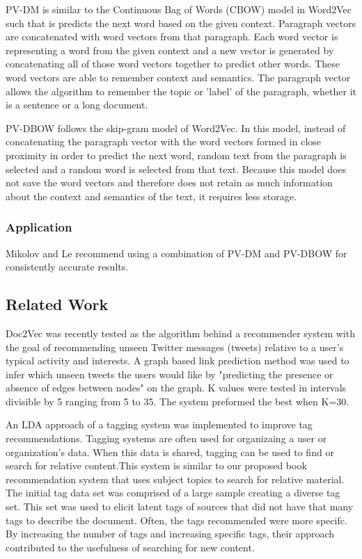 PV-DM is similar to the Continuous Bag of Words (CBOW) model in Word2Vec such that is predicts the next word based on the given context. Paragraph vectors are concatenated with word vectors from that paragraph.  Each word vector is representing a word from the given context and a new vector is generated by concatenating all of those word vectors together to predict other words. These word vectors are able to remember context and semantics. The paragraph vector allows the algorithm to remember the topic or 'label' of the paragraph, whether it is a sentence or a long document. 

PV-DBOW follows the skip-gram model of Word2Vec. In this model, instead of concatenating the paragraph vector with the word vectors formed in close proximity in order to predict the next word, random text from the paragraph is selected and a random word is selected from that text. Because this model does not save the word vectors and therefore does not retain as much information about the context and semantics of the text, it requires less storage.

\subsubsection{Application}

%
%
Mikolov and Le recommend using a combination of PV-DM and PV-DBOW for consistently accurate results.  \cite{RefWorks:doc:5a6e5746e4b0d609eec798d7}

\subsection{Related Work}
\label{sec:related-work}

Doc2Vec was recently tested as the algorithm behind a recommender system with the goal of recommending unseen Twitter messages (tweets) relative to a user's typical activity and interests. A graph based link prediction method was used to infer which unseen tweets the users would like by "predicting the presence or absence of edges between nodes" on the graph.  \cite{RefWorks:doc:5a6e5746e4b0d609eec798d9} K values were tested in intervals divisible by 5 ranging from 5 to 35. The system preformed the best when K=30.

An LDA approach of a tagging system was implemented to improve tag recommendations. \cite{RefWorks:doc:5a73e055e4b0cf1dd767b18f} Tagging systems are often used for organizaing a user or organization's data. When this data is shared, tagging can be used to find or search for relative content.This system is similar to our proposed book recommendation system that uses subject topics to search for relative material. The initial tag data set was comprised of a large sample creating a diverse tag set. This set was used to elicit latent tags of sources that did not have that many tags to describe the document. Often, the tags recommended were more specifc. By increasing the number of tags and increasing specific tags, their approach contributed to the usefulness of searching for new content. 




